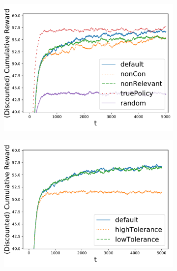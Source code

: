 \documentclass{article}
\begin{document}
	\begin{figure}
		\begin{subfigure}{0.333\textwidth}
			\includegraphics[width=\textwidth]{coffeeRewardsConservativity}
			\caption{}
			\label{fig:results:cons}
		\end{subfigure}
		\begin{subfigure}{0.333\textwidth}
			\includegraphics[width=\textwidth]{coffeeRewardsTolerance}
			\caption{}
			\label{fig:results:tol}
		\end{subfigure}
		\begin{subfigure}{0.333\textwidth}

\end{subfigure}
\end{figure}
\end{document}
